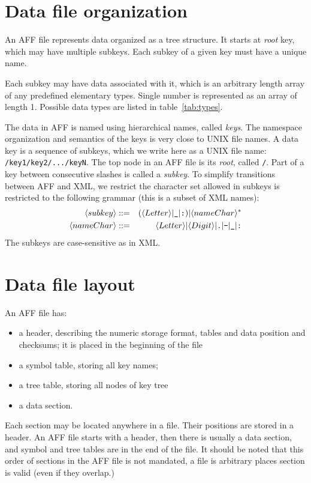 \documentclass[10pt,letterpaper]{article}
\newcommand{\bi}{\begin{itemize}}
\newcommand{\ei}{\end{itemize}}             %
\newcommand{\term}[1]{\textit{#1}\index{\textit{#1}}}          %
\newcommand{\ctext}[1]{\texttt{#1}}         %
\begin{document}
\section{Data file organization}\label{file-org}
An AFF file represents data organized as a tree structure. 
It starts at \term{root} key, which may have multiple subkeys. 
Each subkey of a given key must have a unique name. 

Each subkey may have data associated with it, which is an arbitrary length array of any
predefined elementary types.
Single number is represented as an array of length 1.
Possible data types are listed in table~\ref{tab:types}.

The data in AFF is named using hierarchical names, called \term{keys}. The namespace organization and semantics of the keys is very close to UNIX file names. A data key is a sequence of subkeys, which
we write here as a UNIX file name: \ctext{/key1/key2/.../keyN}. The top node in an AFF file is its
\term{root}, called \ctext{/}. Part of a key between consecutive slashes is called a \term{subkey}. To simplify transitions between AFF and XML, we restrict the character set allowed in subkeys is restricted to the following grammar (this is a subset of XML names):
\begin{eqnarray*}
\langle subkey \rangle & ::= & (\langle Letter \rangle | \verb|_| | \verb|:| ) | \langle nameChar \rangle^{*} \\
\langle nameChar \rangle & ::= & \langle Letter \rangle | \langle Digit \rangle | \verb|.| | \verb|-| | \verb|_| | \verb|:|
\end{eqnarray*}
The subkeys are case-sensitive as in XML.


\section{Data file layout}

An AFF file has:
\bi
\item a header, describing the numeric storage format, tables and data position and checksums; 
it is placed in the beginning of the file
\item a symbol table, storing all key names;
\item a tree table, storing all nodes of key tree
\item a data section.
\ei

Each section may be located anywhere in a file. 
Their positions are stored in a header. 
An AFF file starts with a header, then there is usually a data section, and symbol and tree tables 
are in the end of the file. It should be noted that this order of sections in the AFF file is not mandated, a file is arbitrary places section is valid (even if they overlap.)
\end{document}
